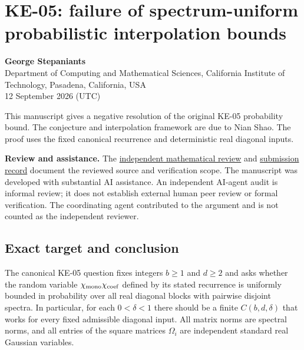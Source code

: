\documentclass[10pt,a4paper]{article}
\begin{document}
\section*{KE-05: failure of spectrum-uniform probabilistic interpolation bounds}\label{ke-05-failure-of-spectrum-uniform-probabilistic-interpolation-bounds}

\textbf{George Stepaniants}\\
Department of Computing and Mathematical Sciences, California Institute of Technology, Pasadena, California, USA\\
12 September 2026 (UTC)

This manuscript gives a negative resolution of the original KE-05 probability bound. The conjecture and interpolation framework are due to Nian Shao. The proof uses the fixed canonical recurrence and deterministic real diagonal inputs.

\textbf{Review and assistance.} The \href{https://github.com/ajt60gaibb/OpenProblemsInNLA/blob/main/references/stepaniants-ke05-2026-09-12/independent-review.md}{independent mathematical review} and \href{https://github.com/ajt60gaibb/OpenProblemsInNLA/blob/main/references/stepaniants-ke05-2026-09-12/README.md}{submission record} document the reviewed source and verification scope. The manuscript was developed with substantial AI assistance. An independent AI-agent audit is informal review; it does not establish external human peer review or formal verification. The coordinating agent contributed to the argument and is not counted as the independent reviewer.

\subsection{Exact target and conclusion}\label{exact-target-and-conclusion}

The canonical KE-05 question fixes integers \(b\geq1\) and \(d\geq2\) and asks whether the random variable \(\chi_{\rm mono}\chi_{\rm coef}\) defined by its stated recurrence is uniformly bounded in probability over all real diagonal blocks with pairwise disjoint spectra. In particular, for each \(0<\delta<1\) there should be a finite \(C(b,d,\delta)\) that works for every fixed admissible diagonal input. All matrix norms are spectral norms, and all entries of the square matrices \(\Omega_i\) are independent standard real Gaussian variables.
\end{document}
